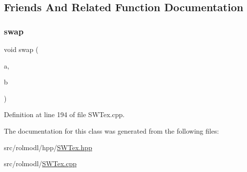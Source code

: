 \subsection{Friends And Related Function Documentation}
\mbox{\label{classrolmodl_1_1_s_w_tex___r_l_e_lock_ac8f8832fdc6e5941ef76802833c599dc}} 
\subsubsection{\texorpdfstring{swap}{swap}}
{\footnotesize\ttfamily void swap (\begin{DoxyParamCaption}\item[{\mbox{\hyperlink{classrolmodl_1_1_s_w_tex___r_l_e_lock}{S\+W\+Tex\+\_\+\+R\+L\+E\+Lock}} \&}]{a,  }\item[{\mbox{\hyperlink{classrolmodl_1_1_s_w_tex___r_l_e_lock}{S\+W\+Tex\+\_\+\+R\+L\+E\+Lock}} \&}]{b }\end{DoxyParamCaption})\hspace{0.3cm}{\ttfamily [friend]}}



Definition at line 194 of file S\+W\+Tex.\+cpp.



The documentation for this class was generated from the following files\+:\begin{DoxyCompactItemize}
\item 
src/rolmodl/hpp/\mbox{\hyperlink{_s_w_tex_8hpp}{S\+W\+Tex.\+hpp}}\item 
src/rolmodl/\mbox{\hyperlink{_s_w_tex_8cpp}{S\+W\+Tex.\+cpp}}\end{DoxyCompactItemize}
